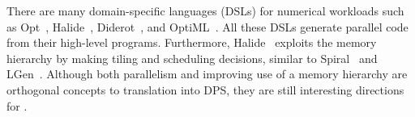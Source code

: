 There are many domain-specific languages (DSLs) for numerical workloads such as Opt~\cite{devito2016opt}, 
Halide~\cite{ragan2013halide}, Diderot~\cite{chiw2012diderot}, and OptiML~\cite{sujeeth2011optiml}. All these DSLs 
generate parallel code from their high-level programs. 
Furthermore, Halide~\cite{ragan2013halide}
exploits the memory hierarchy by making tiling and scheduling decisions, similar to Spiral~\cite{spiral} and LGen~\cite{spampinato2016basic}. 
Although both parallelism and improving use of a memory
hierarchy are orthogonal concepts to translation into DPS, they are still interesting directions for \lafsharp{}.  
